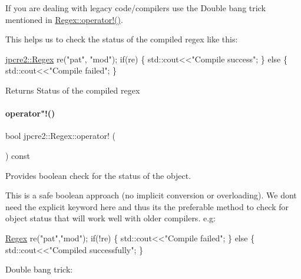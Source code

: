 If you are dealing with legacy code/compilers use the Double bang trick mentioned in \hyperlink{classjpcre2_1_1Regex_afe102e21a96f5cfe12621746f899fa25_afe102e21a96f5cfe12621746f899fa25}{Regex\+::operator!()}.

This helps us to check the status of the compiled regex like this\+:


\begin{DoxyCode}
\hyperlink{classjpcre2_1_1Regex}{jpcre2::Regex} re(\textcolor{stringliteral}{"pat"}, \textcolor{stringliteral}{"mod"});
\textcolor{keywordflow}{if}(re) \{
    std::cout<<\textcolor{stringliteral}{"Compile success"};
\} \textcolor{keywordflow}{else} \{
    std::cout<<\textcolor{stringliteral}{"Compile failed"};
\}
\end{DoxyCode}
 \begin{DoxyReturn}{Returns}
Status of the compiled regex 
\end{DoxyReturn}
\hypertarget{classjpcre2_1_1Regex_afe102e21a96f5cfe12621746f899fa25_afe102e21a96f5cfe12621746f899fa25}{}\label{classjpcre2_1_1Regex_afe102e21a96f5cfe12621746f899fa25_afe102e21a96f5cfe12621746f899fa25} 
\paragraph{\texorpdfstring{operator"!()}{operator!()}}
{\footnotesize\ttfamily bool jpcre2\+::\+Regex\+::operator! (\begin{DoxyParamCaption}{ }\end{DoxyParamCaption}) const\hspace{0.3cm}{\ttfamily [inline]}}



Provides boolean check for the status of the object. 

This is a safe boolean approach (no implicit conversion or overloading). We don\textquotesingle{}t need the explicit keyword here and thus it\textquotesingle{}s the preferable method to check for object status that will work well with older compilers. e.\+g\+:


\begin{DoxyCode}
\hyperlink{classjpcre2_1_1Regex_a302f65cd5747c5d34570ca76516ab715_a302f65cd5747c5d34570ca76516ab715}{Regex} re(\textcolor{stringliteral}{"pat"},\textcolor{stringliteral}{"mod"});
\textcolor{keywordflow}{if}(!re) \{
    std::cout<<\textcolor{stringliteral}{"Compile failed"};
\} \textcolor{keywordflow}{else} \{
    std::cout<<\textcolor{stringliteral}{"Compiled successfully"};
\}
\end{DoxyCode}
 Double bang trick\+:



